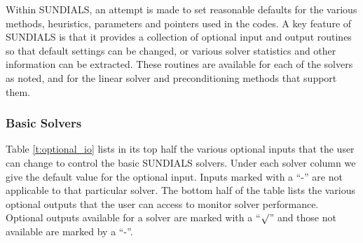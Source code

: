 Within SUNDIALS, an attempt is made to set reasonable defaults for the
various methods, heuristics, parameters and pointers used in the
codes. 
A key feature of SUNDIALS is that it provides a collection of optional
input and output routines so that default settings can be changed, or
various solver statistics and other information can be extracted.
These routines are available for each of the solvers as noted, and for
the linear solver and preconditioning methods that support them.

\subsubsection*{Basic Solvers} 
Table \ref{t:optional_io} lists in its top half the various optional 
inputs that the user can change to control the basic SUNDIALS solvers.
Under each solver column we give the default value for the optional 
input. Inputs marked with a ``-'' are not applicable to that particular 
solver. The bottom half of the table lists the various optional 
outputs that the user can access to monitor solver performance.
Optional outputs available for a solver are marked with a ``$\surd$''
and those not available are marked by a ``-''.


